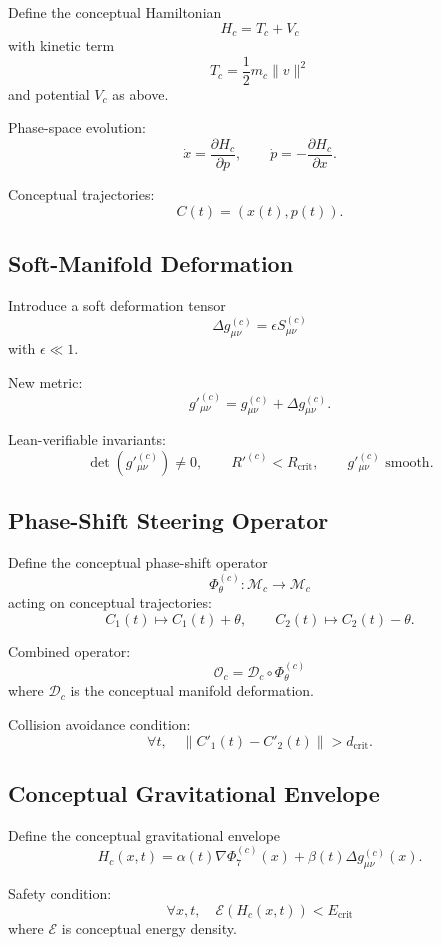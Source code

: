 Define the conceptual Hamiltonian
\[
H_c = T_c + V_c
\]
with kinetic term
\[
T_c = \frac{1}{2} m_c \|v\|^2
\]
and potential $V_c$ as above.

Phase-space evolution:
\[
\dot{x} = \frac{\partial H_c}{\partial p}, \qquad
\dot{p} = -\frac{\partial H_c}{\partial x}.
\]

Conceptual trajectories:
\[
C(t) = (x(t), p(t)).
\]

\subsection{Soft-Manifold Deformation}

Introduce a soft deformation tensor
\[
\Delta g^{(c)}_{\mu\nu} = \epsilon S^{(c)}_{\mu\nu}
\]
with $\epsilon \ll 1$.

New metric:
\[
g'^{(c)}_{\mu\nu} = g^{(c)}_{\mu\nu} + \Delta g^{(c)}_{\mu\nu}.
\]

Lean-verifiable invariants:
\[
\det(g'^{(c)}_{\mu\nu}) \neq 0,
\qquad
R'^{(c)} < R_{\text{crit}},
\qquad
g'^{(c)}_{\mu\nu} \text{ smooth}.
\]

\subsection{Phase-Shift Steering Operator}

Define the conceptual phase-shift operator
\[
\Phi_\theta^{(c)} : \mathcal{M}_c \to \mathcal{M}_c
\]
acting on conceptual trajectories:
\[
C_1(t) \mapsto C_1(t) + \theta,
\qquad
C_2(t) \mapsto C_2(t) - \theta.
\]

Combined operator:
\[
\mathcal{O}_c = \mathcal{D}_c \circ \Phi_\theta^{(c)}
\]
where $\mathcal{D}_c$ is the conceptual manifold deformation.

Collision avoidance condition:
\[
\forall t,\quad
\|C'_1(t) - C'_2(t)\| > d_{\text{crit}}.
\]

\subsection{Conceptual Gravitational Envelope}

Define the conceptual gravitational envelope
\[
H_c(x,t)
  = \alpha(t)\nabla \Phi_7^{(c)}(x)
  + \beta(t)\Delta g^{(c)}_{\mu\nu}(x).
\]

Safety condition:
\[
\forall x,t,\quad
\mathcal{E}(H_c(x,t)) < E_{\text{crit}}
\]
where $\mathcal{E}$ is conceptual energy density.

